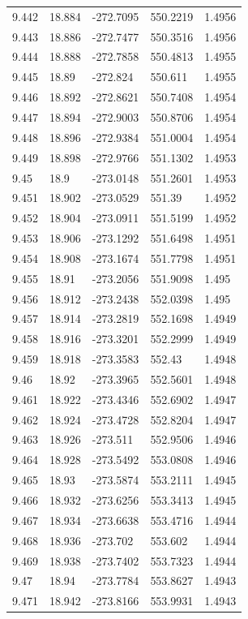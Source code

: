 \begin{tabular}{lllll}
9.442 & 18.884 & -272.7095 & 550.2219 & 1.4956 \\
9.443 & 18.886 & -272.7477 & 550.3516 & 1.4956 \\
9.444 & 18.888 & -272.7858 & 550.4813 & 1.4955 \\
9.445 & 18.89 & -272.824 & 550.611 & 1.4955 \\
9.446 & 18.892 & -272.8621 & 550.7408 & 1.4954 \\
9.447 & 18.894 & -272.9003 & 550.8706 & 1.4954 \\
9.448 & 18.896 & -272.9384 & 551.0004 & 1.4954 \\
9.449 & 18.898 & -272.9766 & 551.1302 & 1.4953 \\
9.45 & 18.9 & -273.0148 & 551.2601 & 1.4953 \\
9.451 & 18.902 & -273.0529 & 551.39 & 1.4952 \\
9.452 & 18.904 & -273.0911 & 551.5199 & 1.4952 \\
9.453 & 18.906 & -273.1292 & 551.6498 & 1.4951 \\
9.454 & 18.908 & -273.1674 & 551.7798 & 1.4951 \\
9.455 & 18.91 & -273.2056 & 551.9098 & 1.495 \\
9.456 & 18.912 & -273.2438 & 552.0398 & 1.495 \\
9.457 & 18.914 & -273.2819 & 552.1698 & 1.4949 \\
9.458 & 18.916 & -273.3201 & 552.2999 & 1.4949 \\
9.459 & 18.918 & -273.3583 & 552.43 & 1.4948 \\
9.46 & 18.92 & -273.3965 & 552.5601 & 1.4948 \\
9.461 & 18.922 & -273.4346 & 552.6902 & 1.4947 \\
9.462 & 18.924 & -273.4728 & 552.8204 & 1.4947 \\
9.463 & 18.926 & -273.511 & 552.9506 & 1.4946 \\
9.464 & 18.928 & -273.5492 & 553.0808 & 1.4946 \\
9.465 & 18.93 & -273.5874 & 553.2111 & 1.4945 \\
9.466 & 18.932 & -273.6256 & 553.3413 & 1.4945 \\
9.467 & 18.934 & -273.6638 & 553.4716 & 1.4944 \\
9.468 & 18.936 & -273.702 & 553.602 & 1.4944 \\
9.469 & 18.938 & -273.7402 & 553.7323 & 1.4944 \\
9.47 & 18.94 & -273.7784 & 553.8627 & 1.4943 \\
9.471 & 18.942 & -273.8166 & 553.9931 & 1.4943 \\

\end{tabular}
